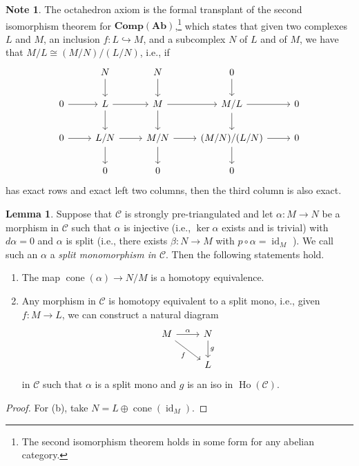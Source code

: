 \documentclass[10pt,letterpaper,cm]{nupset}
\theoremstyle{definition}
\newtheorem{note}[definition]{Note}
\theoremstyle{theorem}
\newtheorem{lemma}[definition]{Lemma}
\theoremstyle{remark}
\newcommand{\1}{\mathbf{1}}
\renewcommand{\c}{\mathscr{C}}
\newcommand{\0}{\vec 0}
\DeclareMathOperator{\id}{id}
\DeclareMathOperator{\cone}{cone}
\DeclareMathOperator{\ho}{Ho}
\begin{document}
\begin{note}
The octahedron axiom is the formal transplant of the second isomorphism theorem for $\mathbf{Comp}(\mathbf{Ab})$,\footnote{The second isomorphism theorem holds in some form for any abelian category.} which states that given two complexes $L$ and $M$, an inclusion $f : L \hookrightarrow M$, and a subcomplex $N$ of $L$ and of $M$, we have that $ M/L \cong (M/N)/(L/N)$, i.e., if
\[
\begin{tikzcd}
            & N \arrow[d]   & N \arrow[d]   & 0 \arrow[d]                     &   \\
0 \arrow[r] & L \arrow[d] \arrow[r]   & M \arrow[d] \arrow[r]   & M/L \arrow[d] \arrow[r]         & 0 \\
0 \arrow[r] & L/N \arrow[d] \arrow[r] & M/N \arrow[d] \arrow[r] & (M/N)/(L/N) \arrow[d] \arrow[r] & 0 \\
            & 0                       & 0                       & 0                               &  
\end{tikzcd}
\]
has exact rows and exact left two columns, then the third column is also exact. 
\end{note}

\begin{lemma}
Suppose that $\c$ is strongly pre-triangulated and let $\alpha : M \to N$ be a morphism in $\c$ such that $\alpha$ is injective (i.e., $\ker{\alpha}$ exists and is trivial) with $d{\alpha} =0$ and $\alpha$ is split (i.e.,  there exists $\beta : N \to M$ with $p \circ \alpha = \id_M$ ). We call such an $\alpha$ a \textit{split monomorphism in $\c$}. Then the following statements hold.
\begin{enumerate}[label=(\alph*)]
\item The map $\cone(\alpha) \to N/M$ is a homotopy equivalence.
\item Any morphism in $\c$ is homotopy equivalent to a split mono, i.e., given $ f: M \to L$, we can construct a natural diagram 
\[
\begin{tikzcd}
M \arrow[r, "\alpha"] \arrow[rd, "f"'] & N \arrow[d, "g"] \\
                                       & L               
\end{tikzcd}
\]
in $\c$ such that $\alpha$ is a split mono and $g$ is an iso in $\ho(\c)$.
\end{enumerate}
\end{lemma}
\begin{proof}
For (b), take $N = L \oplus \cone(\id_M)$.
\end{proof}
\end{document}
